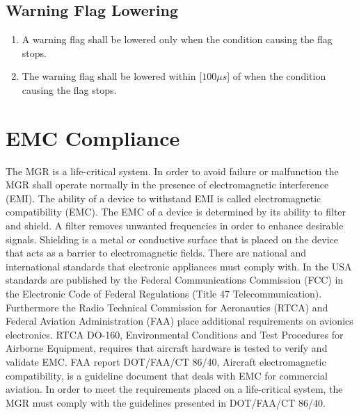 \documentclass[11pt]{article}
\begin{document}
		\subsection{Warning Flag Lowering}

			\begin{enumerate}

				\item A warning flag shall be lowered only when the condition causing the flag stops.

				\item The warning flag shall be lowered within [$100\mu s$] of when the condition causing the flag stops.

			\end{enumerate}

	\section{EMC Compliance}
	The MGR is a life-critical system. In order to avoid failure or malfunction the MGR shall operate normally in the presence of electromagnetic interference (EMI). The ability of a device to withstand EMI is called electromagnetic compatibility (EMC). The EMC of a device is determined by its ability to filter and shield. A filter removes unwanted frequencies in order to enhance desirable signals. Shielding is a metal or conductive surface that is placed on the device that acts as a barrier to electromagnetic fields. There are national and international standards that electronic appliances must comply with. In the USA standards are published by the Federal Communications Commission (FCC) in the Electronic Code of Federal Regulations (Title 47 Telecommunication). Furthermore the Radio Technical Commission for Aeronautics (RTCA) and Federal Aviation Administration (FAA) place additional requirements on avionics electronics. RTCA DO-160, Environmental Conditions and Test Procedures for Airborne Equipment, requires that aircraft hardware is tested to verify and validate EMC. FAA report DOT/FAA/CT 86/40, Aircraft electromagnetic compatibility, is a guideline document that deals with EMC for commercial aviation. In order to meet the requirements placed on a life-critical system, the MGR must comply with the guidelines presented in DOT/FAA/CT 86/40.
\end{document}
